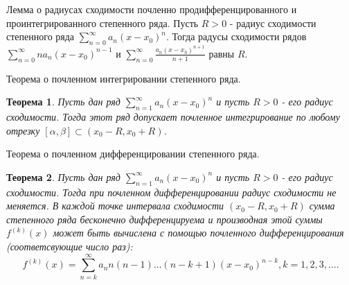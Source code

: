 \documentclass[12pt, a4paper]{article}
\newtheorem{thm}{Теорема}
\newenvironment{field}{}{\newpage}
\newif\ifnote
\newenvironment{note}{\notetrue}{\notefalse}
\begin{document}
\begin{note}
\begin{field}
Лемма о радиусах сходимости почленно продифференцированного и проинтегрированного степенного ряда.
\end{field}
\begin{field}
Пусть $R > 0$ - радиус сходимости степенного ряда $\sum\limits_{n=0}^{\infty}a_n(x-x_0)^n$. Тогда радусы сходимости рядов $\sum\limits_{n=0}^{\infty}na_n(x-x_0)^{n-1}$ и $\sum\limits_{n=0}^{\infty}\frac{a_{n}(x-x_0)^{n+1}}{n+1}$ равны $R$.



\end{field}
\end{note}

\begin{note}
\begin{field}
Теорема о почленном интегрировании степенного ряда.
\end{field}
\begin{field}
\begin{thm}
	Пусть дан ряд  $\sum\limits_{n=1}^{\infty} a_n \left( x - x_0 \right)^n $ и пусть $R > 0$ - его радиус сходимости. Тогда этот ряд допускает почленное интегрирование по любому отрезку  $[\alpha, \beta] \subset \left( x_0 - R, x_0 + R \right) $.
\end{thm}


\end{field}
\end{note}

\begin{note}
\begin{field}
Теорема о почленном дифференцировании степенного ряда.
\end{field}
\begin{field}
\begin{thm}
	Пусть дан ряд  $\sum\limits_{n=1}^{\infty} a_n \left( x - x_0 \right)^n $ и пусть $R > 0$ - его радиус сходимости. Тогда при почленном дифференцировании радиус сходимости не меняется. В каждой точке интервала сходимости $(x_0 - R, x_0 + R)$ сумма степенного ряда бесконечно дифференцируема и производная этой суммы $f^{(k)}(x)$ может быть вычислена с помощью почленного дифференцирования (соответсвующие число раз):
	\[
		f^{\left(k\right) }\left(x\right) = \sum\limits_{n=k}^{\infty} a_n n(n-1)\ldots\left(n - k +1\right)(x - x_0)^{n - k}, k =1, 2, 3, \ldots
	.\]
\end{thm}


\end{field}
\end{note}
\end{document}
